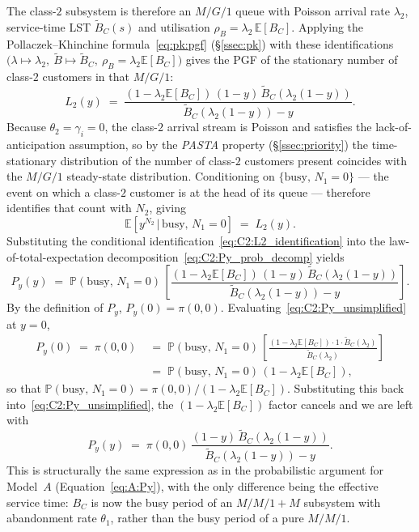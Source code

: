The class-$2$ subsystem is therefore an $M/G/1$ queue with Poisson arrival rate $\lambda_2$, service-time LST $\widetilde{B}_C(s)$ and utilisation $\rho_B=\lambda_2\,\mathbb{E}[B_C]$. Applying the Pollaczek--Khinchine formula~\eqref{eq:pk:pgf} (\S\ref{ssec:pk}) with these identifications $\bigl(\lambda\mapsto\lambda_2,\ \widetilde{B}\mapsto\widetilde{B}_C,\ \rho_B=\lambda_2\mathbb{E}[B_C]\bigr)$ gives the PGF of the stationary number of class-$2$ customers in that $M/G/1$:
\begin{equation}
    L_2(y) \;=\; \frac{(1 - \lambda_2 \mathbb{E}[B_C])\,(1-y)\,\widetilde{B}_C(\lambda_2(1-y))}{\widetilde{B}_C(\lambda_2(1-y)) - y}.
    \label{eq:C2:pk_formula}
\end{equation}
Because $\theta_2=\gamma_i=0$, the class-$2$ arrival stream is Poisson and satisfies the lack-of-anticipation assumption, so by the \emph{PASTA} property (\S\ref{ssec:priority}) the time-stationary distribution of the number of class-$2$ customers present coincides with the $M/G/1$ steady-state distribution. Conditioning on $\{\text{busy},\,N_1=0\}$ --- the event on which a class-$2$ customer is at the head of its queue --- therefore identifies that count with $N_2$, giving
\begin{equation}
    \mathbb{E}\!\left[y^{N_2} \,\big|\, \text{busy},\, N_1=0\right] \;=\; L_2(y).
    \label{eq:C2:L2_identification}
\end{equation}
Substituting the conditional identification~\eqref{eq:C2:L2_identification} into the law-of-total-expectation decomposition~\eqref{eq:C2:Py_prob_decomp} yields
\begin{equation}
    P_y(y) \;=\; \mathbb{P}(\text{busy},\,N_1=0)\,\left[\frac{(1-\lambda_2\mathbb{E}[B_C])\,(1-y)\,\widetilde{B}_C(\lambda_2(1-y))}{\widetilde{B}_C(\lambda_2(1-y)) - y}\right].
    \label{eq:C2:Py_unsimplified}
\end{equation}
By the definition of $P_y$, $P_y(0)=\pi(0,0)$. Evaluating~\eqref{eq:C2:Py_unsimplified} at $y=0$,
\begin{align}
    P_y(0) \;=\; \pi(0,0)
    &\;=\; \mathbb{P}(\text{busy},\,N_1=0)\,\left[\frac{(1-\lambda_2\mathbb{E}[B_C])\cdot 1 \cdot \widetilde{B}_C(\lambda_2)}{\widetilde{B}_C(\lambda_2)}\right] \nonumber \\
    &\;=\; \mathbb{P}(\text{busy},\,N_1=0)\,(1-\lambda_2\mathbb{E}[B_C]),
    \label{eq:C2:Py_at_zero}
\end{align}
so that $\mathbb{P}(\text{busy},\,N_1=0)=\pi(0,0)/(1-\lambda_2\mathbb{E}[B_C])$. Substituting this back into~\eqref{eq:C2:Py_unsimplified}, the $(1-\lambda_2\mathbb{E}[B_C])$ factor cancels and we are left with
\begin{equation}
    P_y(y) \;=\; \pi(0,0)\,\frac{(1-y)\,\widetilde{B}_C(\lambda_2(1-y))}{\widetilde{B}_C(\lambda_2(1-y)) - y}.
    \label{eq:C2:Py}
\end{equation}
This is structurally the same expression as in the probabilistic argument for Model~$A$ (Equation~\eqref{eq:A:Py}), with the only difference being the effective service time: $B_C$ is now the busy period of an $M/M/1+M$ subsystem with abandonment rate $\theta_1$, rather than the busy period of a pure $M/M/1$.

